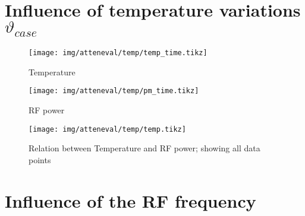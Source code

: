 \newpage
\section{Influence of temperature variations $\vartheta_{case}$}
\begin{figure}[H]
	\centering
	\texttt{[image: img/atteneval/temp/temp\_time.tikz]}
	\caption{Temperature}
	\label{fig:vctrl_spec}
\end{figure}

\begin{figure}[H]
	\centering
	\texttt{[image: img/atteneval/temp/pm\_time.tikz]}
	\caption{RF power}
	\label{fig:vctrl_spec}
\end{figure}

\begin{figure}[H]
	\centering
	\texttt{[image: img/atteneval/temp/temp.tikz]}
	\caption{Relation between Temperature and RF power; showing all data points}
	\label{fig:vctrl_spec}
\end{figure}




\newpage
\section{Influence of the RF frequency}




